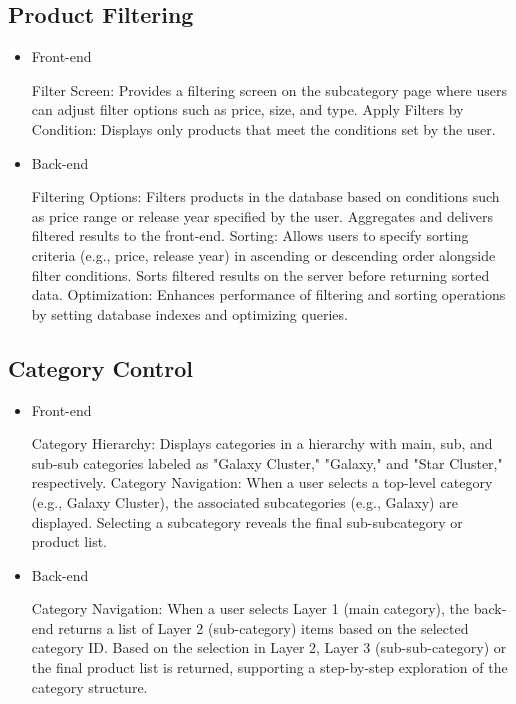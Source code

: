 \documentclass[conference]{IEEEtran}
\begin{document}
\subsection{Product Filtering}

\begin{itemize}
\setlength{\parindent}{2ex}
\setlength{\parskip}{0.5em}
\item Front-end

Filter Screen: Provides a filtering screen on the subcategory page where users can adjust filter options such as price, size, and type. \newline\hspace*{1.2ex}
Apply Filters by Condition: Displays only products that meet the conditions set by the user.

\item Back-end

Filtering Options: Filters products in the database based on conditions such as price range or release year specified by the user. Aggregates and delivers filtered results to the front-end. \newline\hspace*{1.2ex}
Sorting: Allows users to specify sorting criteria (e.g., price, release year) in ascending or descending order alongside filter conditions. Sorts filtered results on the server before returning sorted data.\newline\hspace*{1.2ex}
Optimization: Enhances performance of filtering and sorting operations by setting database indexes and optimizing queries.

\end{itemize}

\subsection{Category Control}

\begin{itemize}
\setlength{\parindent}{2ex}
\setlength{\parskip}{0.5em}
\item Front-end

Category Hierarchy: Displays categories in a hierarchy with main, sub, and sub-sub categories labeled as "Galaxy Cluster," "Galaxy," and "Star Cluster," respectively. \newline\hspace*{1.2ex}
Category Navigation: When a user selects a top-level category (e.g., Galaxy Cluster), the associated subcategories (e.g., Galaxy) are displayed. Selecting a subcategory reveals the final sub-subcategory or product list.

\item Back-end

Category Navigation: When a user selects Layer 1 (main category), the back-end returns a list of Layer 2 (sub-category) items based on the selected category ID. Based on the selection in Layer 2, Layer 3 (sub-sub-category) or the final product list is returned, supporting a step-by-step exploration of the category structure.

\end{itemize}
\end{document}
